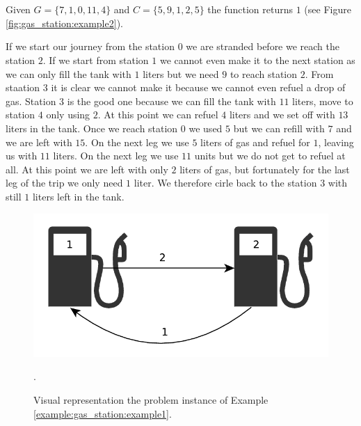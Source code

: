 \begin{exercise}
	\begin{example}
		\label{example:gas_station:example2}
		\hfill \\
		
		\hfill \\
		Given $G=\{7,1,0,11,4\}$ and $C=\{5,9,1,2,5\}$ the function returns $1$ (see Figure \ref{fig:gas_station:example2}).

		If we start our journey from the station $0$ we are stranded before we reach the station $2$. 
		If we start from station $1$ we cannot even make it to the next station as we can only fill the tank with $1$ liters but we need $9$ to reach station $2$. From staation $3$ it is clear we cannot make it because we cannot even refuel a drop of gas. 
		Station $3$ is the good one because we can fill the tank with $11$ liters, move to station $4$ only using $2$. At this point we can refuel $4$ liters and we set off with $13$ liters in the tank. Once we reach station $0$ we used $5$ but we can refill with $7$ and we are left with $15$.
		On the next leg we use $5$ liters of gas and refuel for $1$, leaving us with $11$ liters. On the next leg we use $11$ units but we do not get to refuel at all. At this point we are left with only $2$ liters of gas, but fortunately for the last leg of the trip we only need $1$ liter. 
		We therefore cirle back to the station $3$ with still $1$ liters left in the tank.

	\end{example}

\end{exercise}
\FloatBarrier

\begin{figure}
	\centering
	\includegraphics[width=\textwidth]{sources/gas_station/images/example1}
	\caption[Implicit graph for the Example \ref{example:gas_station:example1}.]
	{Visual representation the problem instance of Example
	\ref{example:gas_station:example1}.}.
	\label{fig:gas_station:example1}
\end{figure}

